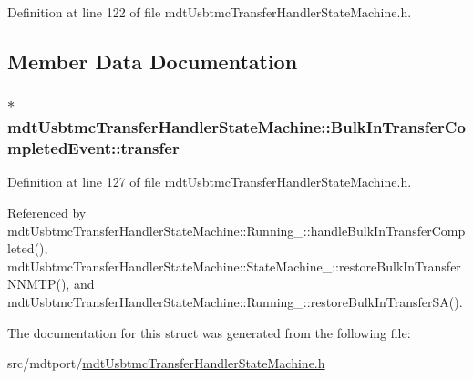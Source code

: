 Definition at line 122 of file mdt\-Usbtmc\-Transfer\-Handler\-State\-Machine.\-h.



\subsection{Member Data Documentation}
\hypertarget{structmdt_usbtmc_transfer_handler_state_machine_1_1_bulk_in_transfer_completed_event_aa49edd0bec2062ef1cb51950fb037b77}{
\subsubsection[{transfer}]{$\ast$ mdt\-Usbtmc\-Transfer\-Handler\-State\-Machine\-::\-Bulk\-In\-Transfer\-Completed\-Event\-::transfer}}\label{structmdt_usbtmc_transfer_handler_state_machine_1_1_bulk_in_transfer_completed_event_aa49edd0bec2062ef1cb51950fb037b77}


Definition at line 127 of file mdt\-Usbtmc\-Transfer\-Handler\-State\-Machine.\-h.



Referenced by mdt\-Usbtmc\-Transfer\-Handler\-State\-Machine\-::\-Running\-\_\-\-::handle\-Bulk\-In\-Transfer\-Completed(), mdt\-Usbtmc\-Transfer\-Handler\-State\-Machine\-::\-State\-Machine\-\_\-\-::restore\-Bulk\-In\-Transfer\-N\-N\-M\-T\-P(), and mdt\-Usbtmc\-Transfer\-Handler\-State\-Machine\-::\-Running\-\_\-\-::restore\-Bulk\-In\-Transfer\-S\-A().



The documentation for this struct was generated from the following file\-:\begin{DoxyCompactItemize}
\item 
src/mdtport/\hyperlink{mdt_usbtmc_transfer_handler_state_machine_8h}{mdt\-Usbtmc\-Transfer\-Handler\-State\-Machine.\-h}\end{DoxyCompactItemize}
